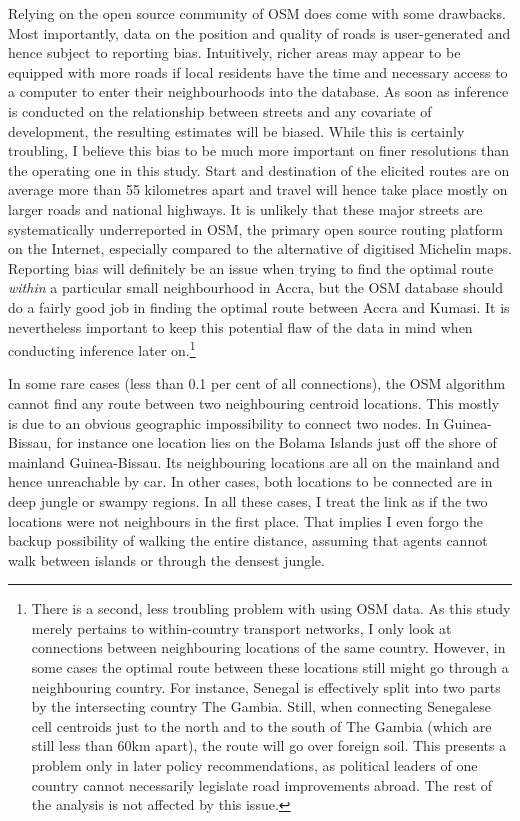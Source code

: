 \documentclass[11pt, oneside]{article}   	%
\begin{document}
Relying on the open source community of OSM does come with some drawbacks. Most importantly, data on the position and quality of roads is user-generated and hence subject to reporting bias. Intuitively, richer areas may appear to be equipped with more roads if local residents have the time and necessary access to a computer to enter their neighbourhoods into the database. As soon as inference is conducted on the relationship between streets and any covariate of development, the resulting estimates will be biased. While this is certainly troubling, I believe this bias to be much more important on finer resolutions than the operating one in this study. Start and destination of the elicited routes are on average more than 55 kilometres apart and travel will hence take place mostly on larger roads and national highways. It is unlikely that these major streets are systematically underreported in OSM, the primary open source routing platform on the Internet, especially compared to the alternative of digitised Michelin maps. Reporting bias will definitely be an issue when trying to find the optimal route \emph{within} a particular small neighbourhood in Accra, but the OSM database should do a fairly good job in finding the optimal route between Accra and Kumasi. It is nevertheless important to keep this potential flaw of the data in mind when conducting inference later on.\footnote{There is a second, less troubling problem with using OSM data. As this study merely pertains to within-country transport networks, I only look at connections between neighbouring locations of the same country. However, in some cases the optimal route between these locations still might go through a neighbouring country. For instance, Senegal is effectively split into two parts by the intersecting country The Gambia. Still, when connecting Senegalese cell centroids just to the north and to the south of The Gambia (which are still less than 60km apart), the route will go over foreign soil. This presents a problem only in later policy recommendations, as political leaders of one country cannot necessarily legislate road improvements abroad. The rest of the analysis is not affected by this issue.}

In some rare cases (less than 0.1 per cent of all connections), the OSM algorithm cannot find any route between two neighbouring centroid locations. This mostly is due to an obvious geographic impossibility to connect two nodes. In Guinea-Bissau, for instance one location lies on the Bolama Islands just off the shore of mainland Guinea-Bissau. Its neighbouring locations are all on the mainland and hence unreachable by car. In other cases, both locations to be connected are in deep jungle or swampy regions. In all these cases, I treat the link as if the two locations were not neighbours in the first place. That implies I even forgo the backup possibility of walking the entire distance, assuming that agents cannot walk between islands or through the densest jungle.
\end{document}
